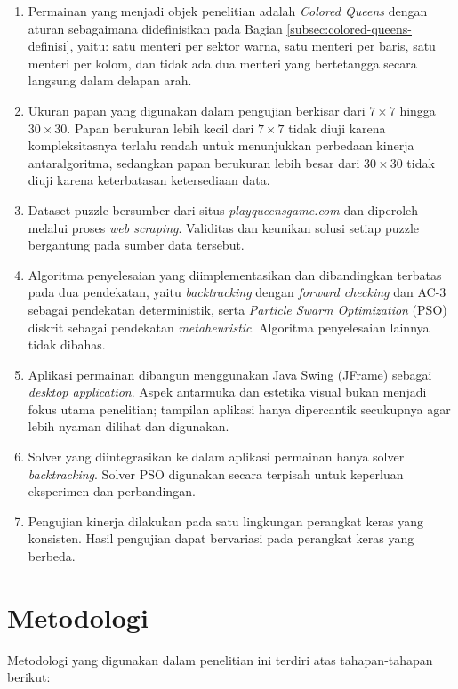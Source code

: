 \begin{enumerate}
	\item Permainan yang menjadi objek penelitian adalah \textit{Colored Queens} dengan aturan sebagaimana didefinisikan pada Bagian \ref{subsec:colored-queens-definisi}, yaitu: satu menteri per sektor warna, satu menteri per baris, satu menteri per kolom, dan tidak ada dua menteri yang bertetangga secara langsung dalam delapan arah.
	\item Ukuran papan yang digunakan dalam pengujian berkisar dari $7 \times 7$ hingga $30 \times 30$. Papan berukuran lebih kecil dari $7 \times 7$ tidak diuji karena kompleksitasnya terlalu rendah untuk menunjukkan perbedaan kinerja antaralgoritma, sedangkan papan berukuran lebih besar dari $30 \times 30$ tidak diuji karena keterbatasan ketersediaan data.
	\item Dataset puzzle bersumber dari situs \textit{playqueensgame.com} dan diperoleh melalui proses \textit{web scraping}. Validitas dan keunikan solusi setiap puzzle bergantung pada sumber data tersebut.
	\item Algoritma penyelesaian yang diimplementasikan dan dibandingkan terbatas pada dua pendekatan, yaitu \textit{backtracking} dengan \textit{forward checking} dan AC-3 sebagai pendekatan deterministik, serta \textit{Particle Swarm Optimization} (PSO) diskrit sebagai pendekatan \textit{metaheuristic}. Algoritma penyelesaian lainnya tidak dibahas.
	\item Aplikasi permainan dibangun menggunakan Java Swing (JFrame) sebagai \textit{desktop application}. Aspek antarmuka dan estetika visual bukan menjadi fokus utama penelitian; tampilan aplikasi hanya dipercantik secukupnya agar lebih nyaman dilihat dan digunakan.
	\item Solver yang diintegrasikan ke dalam aplikasi permainan hanya solver \textit{backtracking}. Solver PSO digunakan secara terpisah untuk keperluan eksperimen dan perbandingan.
	\item Pengujian kinerja dilakukan pada satu lingkungan perangkat keras yang konsisten. Hasil pengujian dapat bervariasi pada perangkat keras yang berbeda.
\end{enumerate}

\section{Metodologi}
\label{sec:metlit}

Metodologi yang digunakan dalam penelitian ini terdiri atas tahapan-tahapan berikut:

